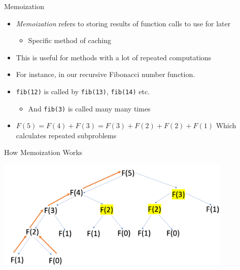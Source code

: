 \documentclass[
  ignorenonframetext,
]{beamer}
\providecommand{\tightlist}{%
  \setlength{\itemsep}{0pt}\setlength{\parskip}{0pt}}\usepackage{longtable,booktabs,array}
\begin{document}
\begin{frame}[fragile]{Memoization}
\protect\hypertarget{memoization}{}
\begin{itemize}
\item
  \emph{Memoization} refers to storing results of function calls to use
  for later

  \begin{itemize}
  \tightlist
  \item
    Specific method of caching
  \end{itemize}
\item
  This is useful for methods with a lot of repeated computations
\item
  For instance, in our recursive Fibonacci number function.
\item
  \texttt{fib(12)} is called by \texttt{fib(13)}, \texttt{fib(14)} etc.

  \begin{itemize}
  \tightlist
  \item
    And \texttt{fib(3)} is called many many times
  \end{itemize}
\item
  \(F(5) = F(4) + F(3) = F(3) + F(2) + F(2) + F(1)\) Which calculates
  repeated subproblems
\end{itemize}
\end{frame}

\begin{frame}{How Memoization Works}
\protect\hypertarget{how-memoization-works}{}

\includegraphics[width=4.44792in,height=\textheight]{images/memo.png}
\end{frame}
\end{document}
